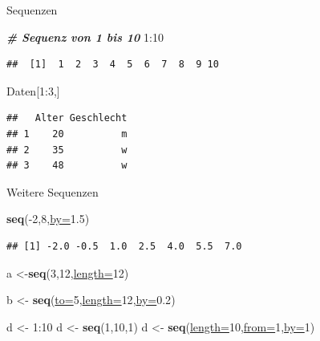 \documentclass[
  ignorenonframetext,
]{beamer}
\newenvironment{Shaded}{\begin{snugshade}}{\end{snugshade}}
\newcommand{\CommentTok}[1]{\textcolor[rgb]{0.00,0.40,1.00}{\textbf{\textit{#1}}}}
\newcommand{\DataTypeTok}[1]{\textcolor[rgb]{0.74,0.68,0.62}{\underline{#1}}}
\newcommand{\DecValTok}[1]{\textcolor[rgb]{0.27,0.67,0.26}{#1}}
\newcommand{\FloatTok}[1]{\textcolor[rgb]{0.27,0.67,0.26}{#1}}
\newcommand{\KeywordTok}[1]{\textcolor[rgb]{0.26,0.66,0.93}{\textbf{#1}}}
\newcommand{\NormalTok}[1]{\textcolor[rgb]{0.74,0.68,0.62}{#1}}
\newcommand{\OperatorTok}[1]{\textcolor[rgb]{0.74,0.68,0.62}{#1}}
\newcommand{\StringTok}[1]{\textcolor[rgb]{0.02,0.61,0.04}{#1}}
\begin{document}
\begin{frame}[fragile]{Sequenzen}
\protect\hypertarget{sequenzen}{}

\begin{Shaded}
\begin{Highlighting}[]
\CommentTok{# Sequenz von 1 bis 10}
\DecValTok{1}\OperatorTok{:}\DecValTok{10}
\end{Highlighting}
\end{Shaded}

\begin{verbatim}
##  [1]  1  2  3  4  5  6  7  8  9 10
\end{verbatim}

\begin{Shaded}
\begin{Highlighting}[]
\NormalTok{Daten[}\DecValTok{1}\OperatorTok{:}\DecValTok{3}\NormalTok{,]}
\end{Highlighting}
\end{Shaded}

\begin{verbatim}
##   Alter Geschlecht
## 1    20          m
## 2    35          w
## 3    48          w
\end{verbatim}

\end{frame}

\begin{frame}[fragile]{Weitere Sequenzen}
\protect\hypertarget{weitere-sequenzen}{}

\begin{Shaded}
\begin{Highlighting}[]
\KeywordTok{seq}\NormalTok{(}\OperatorTok{-}\DecValTok{2}\NormalTok{,}\DecValTok{8}\NormalTok{,}\DataTypeTok{by=}\FloatTok{1.5}\NormalTok{)}
\end{Highlighting}
\end{Shaded}

\begin{verbatim}
## [1] -2.0 -0.5  1.0  2.5  4.0  5.5  7.0
\end{verbatim}

\begin{Shaded}
\begin{Highlighting}[]
\NormalTok{a <-}\KeywordTok{seq}\NormalTok{(}\DecValTok{3}\NormalTok{,}\DecValTok{12}\NormalTok{,}\DataTypeTok{length=}\DecValTok{12}\NormalTok{)}

\NormalTok{b <-}\StringTok{ }\KeywordTok{seq}\NormalTok{(}\DataTypeTok{to=}\DecValTok{5}\NormalTok{,}\DataTypeTok{length=}\DecValTok{12}\NormalTok{,}\DataTypeTok{by=}\FloatTok{0.2}\NormalTok{)}

\NormalTok{d <-}\StringTok{ }\DecValTok{1}\OperatorTok{:}\DecValTok{10}
\NormalTok{d <-}\StringTok{ }\KeywordTok{seq}\NormalTok{(}\DecValTok{1}\NormalTok{,}\DecValTok{10}\NormalTok{,}\DecValTok{1}\NormalTok{)}
\NormalTok{d <-}\StringTok{ }\KeywordTok{seq}\NormalTok{(}\DataTypeTok{length=}\DecValTok{10}\NormalTok{,}\DataTypeTok{from=}\DecValTok{1}\NormalTok{,}\DataTypeTok{by=}\DecValTok{1}\NormalTok{)}
\end{Highlighting}
\end{Shaded}

\end{frame}
\end{document}
